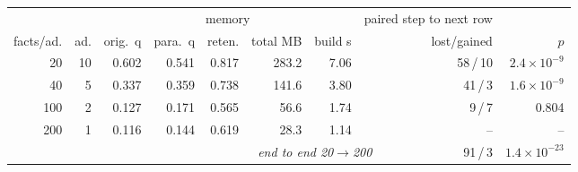 \setlength{\tabcolsep}{4.5pt}
\begin{tabular}{rrrrrrrcrr}
\toprule
& & \multicolumn{5}{c}{memory} & \multicolumn{2}{c}{paired step to next row} \\
\cmidrule(lr){3-7}\cmidrule(lr){9-10}
facts/ad. & ad. & orig.\ q & para.\ q & reten. & total MB & build s & & lost/gained & $p$ \\
\midrule
20 & 10 & 0.602 & 0.541 & 0.817 & 283.2 & 7.06 & & 58\,/\,10 & $2.4\times10^{-9}$ \\
40 & 5 & 0.337 & 0.359 & 0.738 & 141.6 & 3.80 & & 41\,/\,3 & $1.6\times10^{-9}$ \\
100 & 2 & 0.127 & 0.171 & 0.565 & 56.6 & 1.74 & & 9\,/\,7 & 0.804 \\
200 & 1 & 0.116 & 0.144 & 0.619 & 28.3 & 1.14 & & -- & -- \\
\midrule
\multicolumn{8}{r}{\itshape end to end 20$\to$200} & 91\,/\,3 & $1.4\times10^{-23}$ \\
\bottomrule
\end{tabular}
